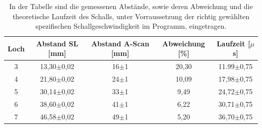 \documentclass[titlepage = firstcover]{scrartcl}
\begin{document}
            \begin{table}[h]
                \centering
                \caption{In der Tabelle sind die gemessenen Abstände, sowie deren Abweichung und die theoretische Laufzeit des Schalls, unter Vorraussetzung der richtig gewählten spezifischen Schallgeschwindigkeit im Programm, eingetragen.}
                \label{tab:Abstand1}

                \begin{tabular}{c c c c c}
                    \toprule
                    {Loch} & {Abstand SL [mm]} & {Abstand A-Scan [mm]} & {Abweichung [\%]} & {Laufzeit [$\mu$s]}  \\
                    \midrule
                    3   &   13,30$\pm$0,02   &   16$\pm$1  &   20,30   &   11.99$\pm$0,75   \\
                    4   &   21,80$\pm$0,02   &   24$\pm$1  &   10,09   &   17,98$\pm$0,75   \\
                    5   &   30,14$\pm$0,02   &   33$\pm$1  &   9,49    &   24,72$\pm$0,75   \\
                    6   &   38,60$\pm$0,02   &   41$\pm$1  &   6,22    &   30,71$\pm$0,75   \\
                    7   &   46,58$\pm$0,02   &   49$\pm$1  &   5,20    &   36,70$\pm$0,75   \\       
                    \bottomrule
                \end{tabular}

            \end{table}

            \FloatBarrier
            \noindent




        
\end{document}
